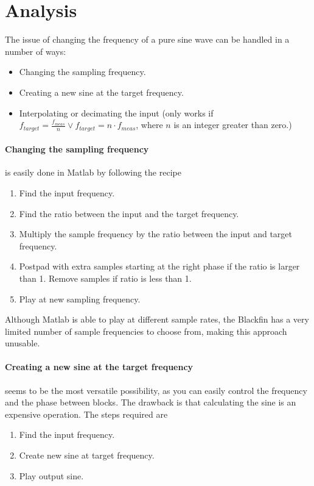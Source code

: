 
\section{Analysis}
\label{sec:simpleanal}
The issue of changing the frequency of a pure sine wave can be handled in a number of ways:
\begin{itemize}
	\item Changing the sampling frequency.
	\item Creating a new sine at the target frequency.
	\item Interpolating or decimating the input (only works if $f_{target}=\frac{f_{meas}}{n}\vee f_{target} =n\cdot f_{meas}$, where $n$ is an integer greater than zero.)
\end{itemize}

\paragraph{Changing the sampling frequency} is easily done in Matlab by following the recipe
\begin{enumerate}
	\item Find the input frequency.
	\item Find the ratio between the input and the target frequency.
	\item Multiply the sample frequency by the ratio between the input and target frequency.
	\item Postpad with extra samples starting at the right phase if the ratio is larger than 1. Remove samples if ratio is less than 1.
	\item Play at new sampling frequency.
\end{enumerate}
Although Matlab is able to play at different sample rates, the Blackfin has a very limited number of sample frequencies to choose from, making this approach unusable\cite{AD1836A}.

\paragraph{Creating a new sine at the target frequency} seems to be the most versatile possibility, as you can easily control the frequency and the phase between blocks. The drawback is that calculating the sine is an expensive operation. The steps required are
\begin{enumerate}
	\item Find the input frequency.
	\item Create new sine at target frequency.
	\item Play output sine.
\end{enumerate}


